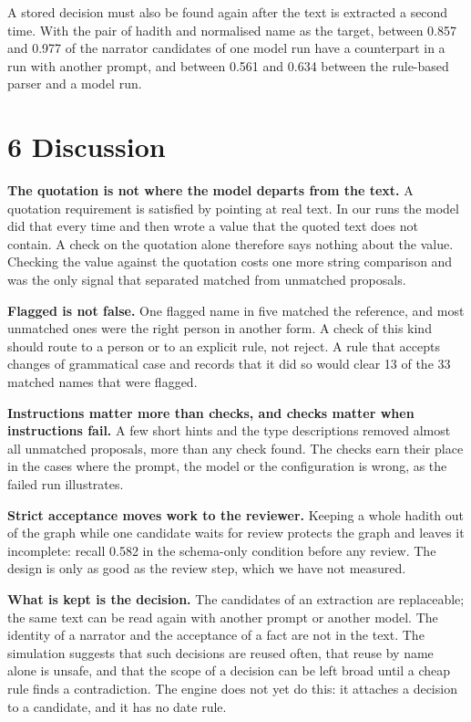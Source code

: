 \documentclass[
  english,
]{article}
\begin{document}
A stored decision must also be found again after the text is extracted a
second time. With the pair of hadith and normalised name as the target,
between 0.857 and 0.977 of the narrator candidates of one model run have
a counterpart in a run with another prompt, and between 0.561 and 0.634
between the rule-based parser and a model run.

\section{6 Discussion}\label{discussion}

\textbf{The quotation is not where the model departs from the text.} A
quotation requirement is satisfied by pointing at real text. In our runs
the model did that every time and then wrote a value that the quoted
text does not contain. A check on the quotation alone therefore says
nothing about the value. Checking the value against the quotation costs
one more string comparison and was the only signal that separated
matched from unmatched proposals.

\textbf{Flagged is not false.} One flagged name in five matched the
reference, and most unmatched ones were the right person in another
form. A check of this kind should route to a person or to an explicit
rule, not reject. A rule that accepts changes of grammatical case and
records that it did so would clear 13 of the 33 matched names that were
flagged.

\textbf{Instructions matter more than checks, and checks matter when
instructions fail.} A few short hints and the type descriptions removed
almost all unmatched proposals, more than any check found. The checks
earn their place in the cases where the prompt, the model or the
configuration is wrong, as the failed run illustrates.

\textbf{Strict acceptance moves work to the reviewer.} Keeping a whole
hadith out of the graph while one candidate waits for review protects
the graph and leaves it incomplete: recall 0.582 in the schema-only
condition before any review. The design is only as good as the review
step, which we have not measured.

\textbf{What is kept is the decision.} The candidates of an extraction
are replaceable; the same text can be read again with another prompt or
another model. The identity of a narrator and the acceptance of a fact
are not in the text. The simulation suggests that such decisions are
reused often, that reuse by name alone is unsafe, and that the scope of
a decision can be left broad until a cheap rule finds a contradiction.
The engine does not yet do this: it attaches a decision to a candidate,
and it has no date rule.
\end{document}
